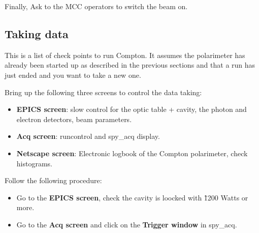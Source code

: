 {\begin{itemize}
Finally, Ask to the MCC operators to switch the beam on.
\end{itemize}

\subsection{Taking data}
This is a list of check points to run Compton. It assumes the polarimeter 
has already been started up as described in the previous sections and  
that a run has just ended and you want to take a 
new one.

Bring up the  following three screens to control the data taking:

\begin{itemize}
\item {\bf EPICS screen}: slow control for the optic table + cavity, the 
photon and electron detectors, beam parameters.
\item {\bf Acq screen}: runcontrol and spy\_acq display.
\item {\bf Netscape screen}: Electronic logbook of the Compton polarimeter, 
check histograms.
 \end{itemize}

Follow the following procedure:
\begin{itemize}
\item Go to the {\bf EPICS screen}, check the cavity is loocked with \~1200 Watts 
or more.
\item Go to the {\bf Acq screen} and click on the {\bf Trigger window} in spy\_acq. 
   

\end{itemize}}
